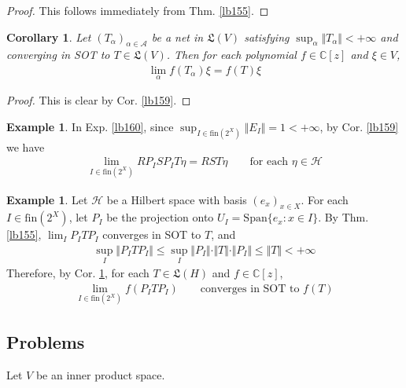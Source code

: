 \documentclass[12pt,b5paper,notitlepage]{article}
\theoremstyle{definition}
\newtheorem{eg}[df]{Example}
\theoremstyle{plain}
\newtheorem{co}[df]{Corollary}
\newcommand{\fk}{\mathfrak}
\newcommand{\Span}{\mathrm{Span}}
\newcommand{\scr}{\mathscr}
\newcommand{\Cbb}{\mathbb C}
\newcommand{\fin}{\mathrm{fin}}
\newcommand{\MH}{\mathcal H}
\numberwithin{equation}{section}
\begin{document}
\begin{proof}
This follows immediately from Thm. \ref{lb155}.
\end{proof}


\begin{co}\label{lb161}
Let $(T_\alpha)_{\alpha\in\scr A}$ be a net in $\fk L(V)$ satisfying $\sup_\alpha\Vert T_\alpha\Vert<+\infty$ and converging in SOT to $T\in\fk L(V)$. Then for each polynomial $f\in\Cbb[z]$ and $\xi\in V$,
\begin{align*}
\lim_\alpha f(T_\alpha)\xi=f(T)\xi
\end{align*}
\end{co}


\begin{proof}
This is clear by Cor. \ref{lb159}.
\end{proof}



\begin{eg}
In Exp. \ref{lb160}, since $\sup_{I\in\fin(2^X)}\Vert E_I\Vert=1<+\infty$, by Cor. \ref{lb159} we have
\begin{align*}
\lim_{I\in\fin(2^X)}RP_ISP_IT\eta=RST\eta\qquad\text{for each $\eta\in\MH$}
\end{align*}
\end{eg}




\begin{eg}\label{lb397}
Let $\MH$ be a Hilbert space with basis $(e_x)_{x\in X}$. For each $I\in\fin(2^X)$, let $P_I$ be the projection onto $U_I=\Span\{e_x:x\in I\}$. By Thm. \ref{lb155}, $\lim_I P_ITP_I$ converges in SOT to $T$, and 
\begin{align*}
\sup_I\Vert P_ITP_I\Vert\leq\sup_I \Vert P_I\Vert\cdot\Vert T\Vert\cdot\Vert P_I\Vert\leq \Vert T\Vert<+\infty
\end{align*}
Therefore, by Cor. \ref{lb161}, for each $T\in\fk L(H)$ and $f\in\Cbb[z]$, 
\begin{align*}
\lim_{I\in\fin(2^X)} f(P_ITP_I)\qquad\text{converges in SOT to }f(T)
\end{align*}
\end{eg}







\subsection{Problems}


Let $V$ be an inner product space.
\end{document}
